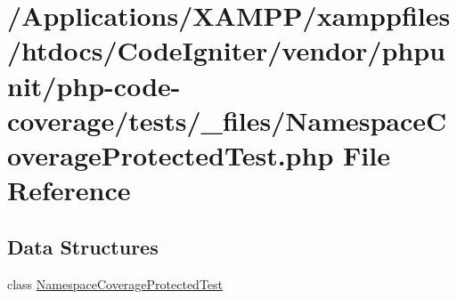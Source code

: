\hypertarget{php-code-coverage_2tests_2__files_2_namespace_coverage_protected_test_8php}{}\section{/\+Applications/\+X\+A\+M\+P\+P/xamppfiles/htdocs/\+Code\+Igniter/vendor/phpunit/php-\/code-\/coverage/tests/\+\_\+files/\+Namespace\+Coverage\+Protected\+Test.php File Reference}
\label{php-code-coverage_2tests_2__files_2_namespace_coverage_protected_test_8php}
\subsection*{Data Structures}
\begin{DoxyCompactItemize}
\item 
class \mbox{\hyperlink{class_namespace_coverage_protected_test}{Namespace\+Coverage\+Protected\+Test}}
\end{DoxyCompactItemize}
